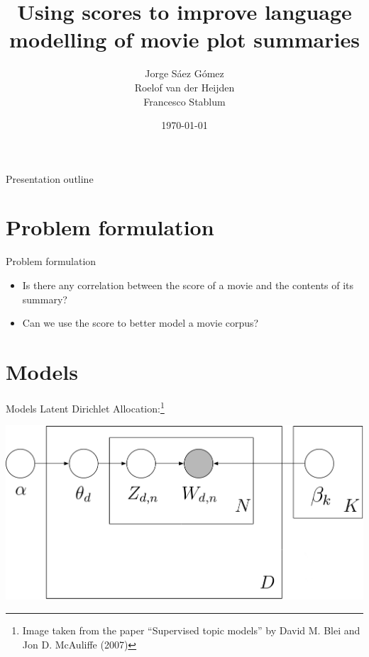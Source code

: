 \documentclass{beamer}
\title{Using scores to improve language modelling of movie plot summaries}
\author[J. Sáez Gómez, R. vd Heijden, F. Stablum]{Jorge Sáez Gómez\\Roelof van der Heijden\\Francesco Stablum}
\institute{Universiteit van Amsterdam}
\date{\today}
\begin{document}
\begin{frame}
	\maketitle
\end{frame}

\begin{frame}{Presentation outline}
	\tableofcontents
\end{frame}

\section{Problem formulation}

\begin{frame}{Problem formulation}
	\begin{itemize}
	\item Is there any correlation between the score of a movie and the contents of its summary?
	\item Can we use the score to better model a movie corpus?
	\end{itemize}
\end{frame}

\section{Models}

\begin{frame}{Models}
	Latent Dirichlet Allocation:\footnote{\tiny{}Image taken from the paper ``Supervised topic models'' by David M. Blei and Jon D. McAuliffe (2007)}

	\includegraphics[width=\textwidth]{LDA.png}
\end{frame}
\end{document}
